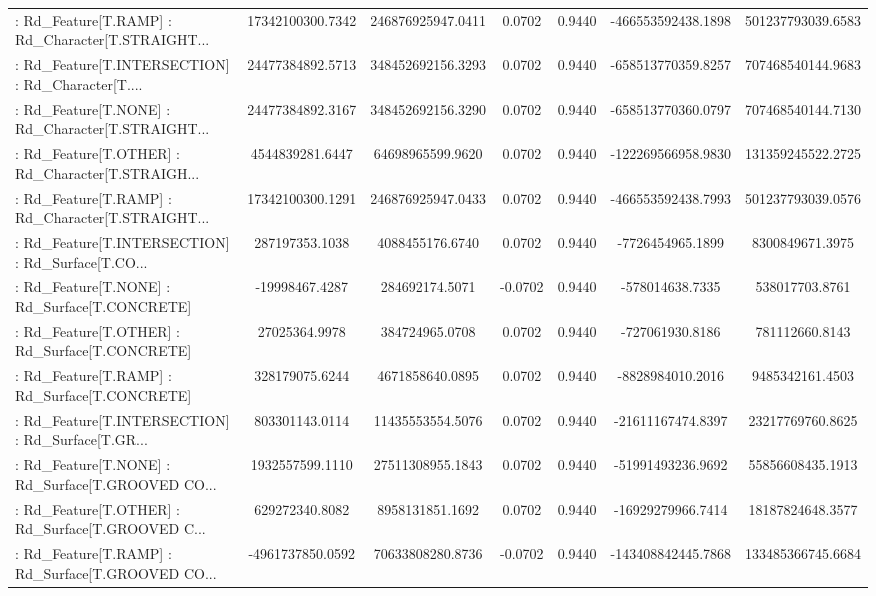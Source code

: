 \begin{longtable}{p{4cm}cccccc}
 : Rd\_Feature[T.RAMP] : Rd\_Character[T.STRAIGHT... &  17342100300.7342 & 246876925947.0411 &  0.0702 &       0.9440 & -466553592438.1898 & 501237793039.6583 \\
 : Rd\_Feature[T.INTERSECTION] : Rd\_Character[T.... &  24477384892.5713 & 348452692156.3293 &  0.0702 &       0.9440 & -658513770359.8257 & 707468540144.9683 \\
 : Rd\_Feature[T.NONE] : Rd\_Character[T.STRAIGHT... &  24477384892.3167 & 348452692156.3290 &  0.0702 &       0.9440 & -658513770360.0797 & 707468540144.7130 \\
 : Rd\_Feature[T.OTHER] : Rd\_Character[T.STRAIGH... &   4544839281.6447 &  64698965599.9620 &  0.0702 &       0.9440 & -122269566958.9830 & 131359245522.2725 \\
 : Rd\_Feature[T.RAMP] : Rd\_Character[T.STRAIGHT... &  17342100300.1291 & 246876925947.0433 &  0.0702 &       0.9440 & -466553592438.7993 & 501237793039.0576 \\
 : Rd\_Feature[T.INTERSECTION] : Rd\_Surface[T.CO... &    287197353.1038 &   4088455176.6740 &  0.0702 &       0.9440 &   -7726454965.1899 &   8300849671.3975 \\
 : Rd\_Feature[T.NONE] : Rd\_Surface[T.CONCRETE]     &    -19998467.4287 &    284692174.5071 & -0.0702 &       0.9440 &    -578014638.7335 &    538017703.8761 \\
 : Rd\_Feature[T.OTHER] : Rd\_Surface[T.CONCRETE]    &     27025364.9978 &    384724965.0708 &  0.0702 &       0.9440 &    -727061930.8186 &    781112660.8143 \\
 : Rd\_Feature[T.RAMP] : Rd\_Surface[T.CONCRETE]     &    328179075.6244 &   4671858640.0895 &  0.0702 &       0.9440 &   -8828984010.2016 &   9485342161.4503 \\
 : Rd\_Feature[T.INTERSECTION] : Rd\_Surface[T.GR... &    803301143.0114 &  11435553554.5076 &  0.0702 &       0.9440 &  -21611167474.8397 &  23217769760.8625 \\
 : Rd\_Feature[T.NONE] : Rd\_Surface[T.GROOVED CO... &   1932557599.1110 &  27511308955.1843 &  0.0702 &       0.9440 &  -51991493236.9692 &  55856608435.1913 \\
 : Rd\_Feature[T.OTHER] : Rd\_Surface[T.GROOVED C... &    629272340.8082 &   8958131851.1692 &  0.0702 &       0.9440 &  -16929279966.7414 &  18187824648.3577 \\
 : Rd\_Feature[T.RAMP] : Rd\_Surface[T.GROOVED CO... &  -4961737850.0592 &  70633808280.8736 & -0.0702 &       0.9440 & -143408842445.7868 & 133485366745.6684 \\

\end{longtable}
